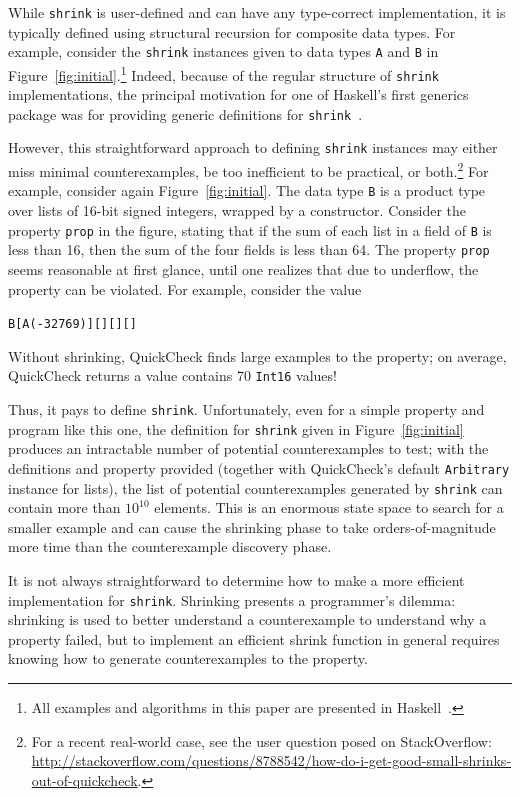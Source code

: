\documentclass[10pt]{sigplanconf}
\newenvironment{code}{\begin{alltt}}{\end{alltt}}
\newcommand{\ttp}[1]{\texttt{#1}}
\begin{document}
While \ttp{shrink} is user-defined and can have any type-correct implementation,
it is typically defined using structural recursion for composite data types.
For example, consider the \ttp{shrink} instances given to data types \ttp{A} and
\ttp{B} in Figure~\ref{fig:initial}.\footnote{All examples and algorithms in
  this paper are presented in Haskell~\cite{haskell98}.}  Indeed, because of the regular
structure of \ttp{shrink} implementations, the principal motivation for one of
Haskell's first generics package was for providing generic definitions for
\ttp{shrink}~\cite{syb}.

However, this straightforward approach to defining \ttp{shrink} instances may
either miss minimal counterexamples, be too inefficient to be practical, or
both.\footnote{For a recent real-world case, see the user question posed on
  StackOverflow:
  \url{http://stackoverflow.com/questions/8788542/how-do-i-get-good-small-shrinks-out-of-quickcheck}.}
For example, consider again Figure~\ref{fig:initial}.  The data type \ttp{B} is
a product type over lists of 16-bit signed integers, wrapped by a constructor.
Consider the property \ttp{prop} in the figure, stating that if the sum of each
list in a field of \ttp{B} is less than 16, then the sum of the four fields is
less than 64.  The property \ttp{prop} seems reasonable at first glance, until
one realizes that due to underflow, the property can be violated.  For example,
consider the value
%
\begin{code}
B [A (-32769)] [] [] []
\end{code}
%
\noindent
Without shrinking, QuickCheck finds large examples to the property; on average,
QuickCheck returns a value contains 70 \ttp{Int16} values!

Thus, it pays to define \ttp{shrink}.  Unfortunately, even for a simple property
and program like this one, the definition for \ttp{shrink} given in
Figure~\ref{fig:initial} produces an intractable number of potential
counterexamples to test; with the definitions and property provided (together
with QuickCheck's default \ttp{Arbitrary} instance for lists), the list of
potential counterexamples generated by \ttp{shrink} can contain more than
$10^{10}$ elements.  This is an enormous state space to search for a smaller
example and can cause the shrinking phase to take orders-of-magnitude more time
than the counterexample discovery phase.

It is not always straightforward to determine how to make a more efficient
implementation for \ttp{shrink}.  Shrinking presents a programmer's dilemma:
shrinking is used to better understand a counterexample to understand why a
property failed, but to implement an efficient shrink function in general
requires knowing how to generate counterexamples to the property.
\end{document}
